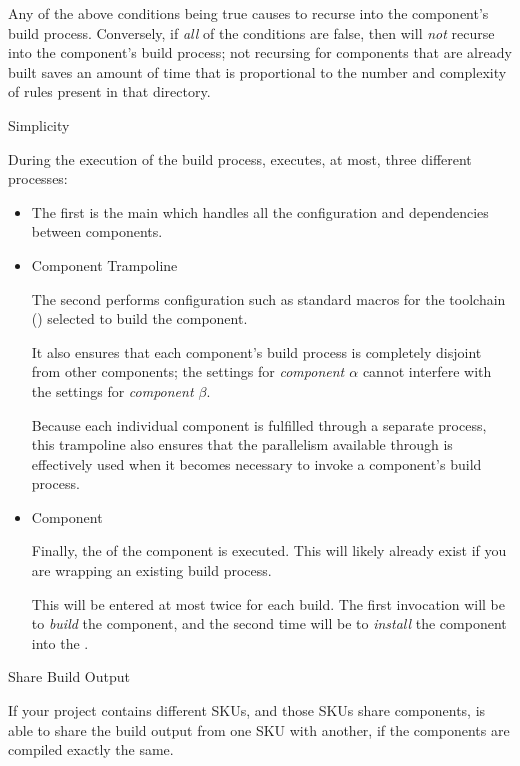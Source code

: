 \begin{description}
  Any of the above conditions being true causes \lmsbw to recurse into
  the component's build process.  Conversely, if \emph{all} of the
  conditions are false, then \lmsbw will \emph{not} recurse into the
  component's build process; not recursing for components that are
  already built saves an amount of time that is proportional to the
  number and complexity of \make rules present in that directory.

\item \makefile Simplicity

  During the execution of the build process, \lmsbw executes, at most,
  three different \makefile processes:

  \begin{itemize}
  \item \lmsbw \makefile

    The first is the main \lmsbw \makefile which handles all the
    configuration and dependencies between components.

  \item Component Trampoline \makefile

    The second \makefile performs configuration such as standard
    macros for the toolchain ()
    selected to build the component.

    It also ensures that each component's build process is completely
    disjoint from other components; the settings for \emph{component
      $\alpha$} cannot interfere with the settings for \emph{component
      $\beta$}.

    Because each individual component is fulfilled through a separate
    \make process, this trampoline also ensures that the parallelism
    available through \gnumake is effectively used when it becomes
    necessary to invoke a component's build process.

  \item Component \makefile

    Finally, the \makefile of the component is executed.  This will
    likely already exist if you are wrapping an existing build process.

    This \makefile will be entered at most twice for each build.  The
    first invocation will be to \emph{build} the component, and the
    second time will be to \emph{install} the component into the
    \destdir.
\end{itemize}

\item Share Build Output

  If your project contains different SKUs, and those SKUs share
  components, \lmsbw is able to share the build output from one SKU
  with another, if the components are compiled exactly the same.

\end{description}

